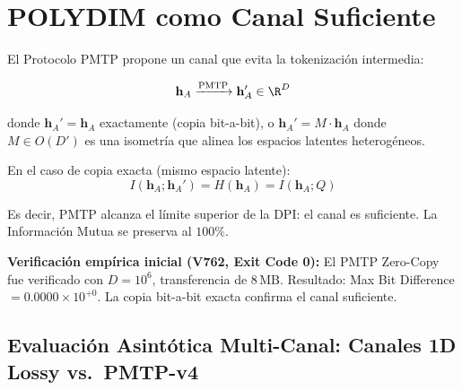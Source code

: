 \section{POLYDIM como Canal Suficiente}

El Protocolo PMTP propone un canal que evita la tokenización intermedia:

\begin{equation}
\mathbf{h}_A \xrightarrow{\text{PMTP}} \mathbf{h}_A' \in \R^{D}
\end{equation}

donde $\mathbf{h}_A' = \mathbf{h}_A$ exactamente (copia bit-a-bit), o
$\mathbf{h}_A' = M \cdot \mathbf{h}_A$ donde $M \in O(D')$ es una isometría
que alinea los espacios latentes heterogéneos.

En el caso de copia exacta (mismo espacio latente):
\begin{equation}
I(\mathbf{h}_A; \mathbf{h}_A') = H(\mathbf{h}_A) = I(\mathbf{h}_A; Q)
\end{equation}

Es decir, PMTP alcanza el límite superior de la DPI: el canal es suficiente.
La Información Mutua se preserva al $100\%$.

\begin{certifiedbox}
\textbf{Verificación empírica inicial (V762, Exit Code 0):}
El PMTP Zero-Copy fue verificado con $D = 10^6$, transferencia de $8\,\text{MB}$.
Resultado: Max Bit Difference $= 0.0000 \times 10^{+0}$.
La copia bit-a-bit exacta confirma el canal suficiente.
\end{certifiedbox}

\subsection{Evaluación Asintótica Multi-Canal: Canales 1D Lossy vs.\ PMTP-v4}
\label{subsec:eval_dpi_multicanal}

